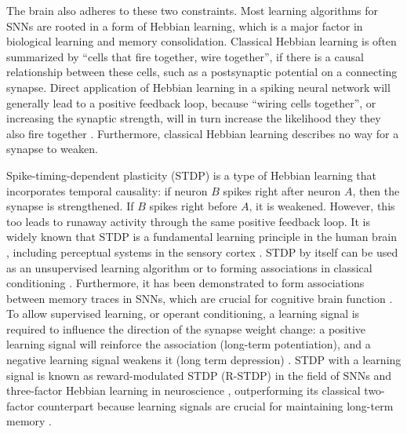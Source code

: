 The brain also adheres to these two constraints.
Most learning algorithms for SNNs are rooted in a form of Hebbian learning, which is a major factor in biological learning and memory consolidation.
Classical Hebbian learning is often summarized by ``cells that fire together, wire together'', if there is a causal relationship between these cells, such as a postsynaptic potential on a connecting synapse.
Direct application of Hebbian learning in a spiking neural network will generally lead to a positive feedback loop, because ``wiring cells together'', or increasing the synaptic strength, will in turn increase the likelihood they they also fire together \citep{zenke2017temporal}.
Furthermore, classical Hebbian learning describes no way for a synapse to weaken.

Spike-timing-dependent plasticity (STDP) \citep{abbott2000synaptic,caporale2008spike} is a type of Hebbian learning that incorporates temporal causality: if neuron $B$ spikes right after neuron $A$, then the synapse is strengthened.
If $B$ spikes right before $A$, it is weakened.
However, this too leads to runaway activity through the same positive feedback loop.
It is widely known that STDP is a fundamental learning principle in the human brain \citep{kandel2000principles,caporale2008spike}, including perceptual systems in the sensory cortex \citep{huang2014associative}.
STDP by itself can be used as an unsupervised learning algorithm or to forming associations in classical conditioning \citep{diehl2015unsupervised,kim2018demonstration}.
Furthermore, it has been demonstrated to form associations between memory traces in SNNs, which are crucial for cognitive brain function \citep{pokorny2020stdp}.
To allow supervised learning, or operant conditioning, a learning signal is required to influence the direction of the synapse weight change: a positive learning signal will reinforce the association (long-term potentiation), and a negative learning signal weakens it (long term depression) \citep{lobov2020spatial}.
STDP with a learning signal is known as reward-modulated STDP (R-STDP) \citep{legenstein2008learning} in the field of SNNs and three-factor Hebbian learning in neuroscience \citep{fremaux2016neuromodulated}, outperforming its classical two-factor counterpart \citep{porr2007learning} because learning signals are crucial for maintaining long-term memory \citep{bailey2000heterosynaptic}.

